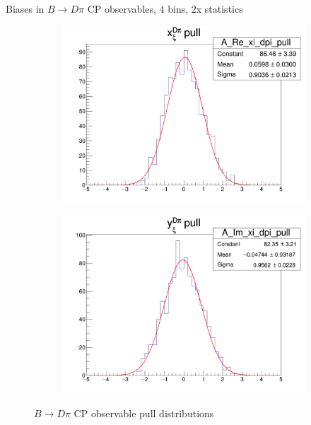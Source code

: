 \documentclass{beamer}
\begin{document}
\begin{frame}{Biases in $B\to D\pi$ CP observables, $4$ bins, $2$x statistics}
  \begin{figure}
    \centering
    \vspace{-0.2cm}
    \begin{subfigure}{0.5\textwidth}
      \includegraphics[width = 1.0\textwidth]{A_Re_xi_dpi_4Bins_StatsMultiplier2_pull.png}
    \end{subfigure}%
    \begin{subfigure}{0.5\textwidth}
      \includegraphics[width = 1.0\textwidth]{A_Im_xi_dpi_4Bins_StatsMultiplier2_pull.png}
    \end{subfigure}
    \caption{$B\to D\pi$ CP observable pull distributions}
  \end{figure}
\end{frame}
\end{document}
